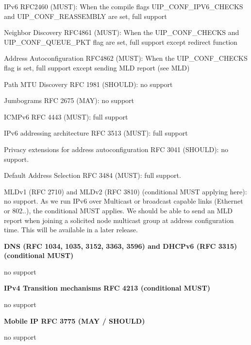 \begin{DoxyItemize}
\item \-I\-Pv6 \-R\-F\-C2460 (\-M\-U\-S\-T)\-: \-When the compile flags \-U\-I\-P\-\_\-\-C\-O\-N\-F\-\_\-\-I\-P\-V6\-\_\-\-C\-H\-E\-C\-K\-S and \-U\-I\-P\-\_\-\-C\-O\-N\-F\-\_\-\-R\-E\-A\-S\-S\-E\-M\-B\-L\-Y are set, full support \item \-Neighbor \-Discovery \-R\-F\-C4861 (\-M\-U\-S\-T)\-: \-When the \-U\-I\-P\-\_\-\-C\-O\-N\-F\-\_\-\-C\-H\-E\-C\-K\-S and \-U\-I\-P\-\_\-\-C\-O\-N\-F\-\_\-\-Q\-U\-E\-U\-E\-\_\-\-P\-K\-T flag are set, full support except redirect function \item \-Address \-Autoconfiguration \-R\-F\-C4862 (\-M\-U\-S\-T)\-: \-When the \-U\-I\-P\-\_\-\-C\-O\-N\-F\-\_\-\-C\-H\-E\-C\-K\-S flag is set, full support except sending \-M\-L\-D report (see \-M\-L\-D) \item \-Path \-M\-T\-U \-Discovery \-R\-F\-C 1981 (\-S\-H\-O\-U\-L\-D)\-: no support \item \-Jumbograms \-R\-F\-C 2675 (\-M\-A\-Y)\-: no support \item \-I\-C\-M\-Pv6 \-R\-F\-C 4443 (\-M\-U\-S\-T)\-: full support \item \-I\-Pv6 addressing architecture \-R\-F\-C 3513 (\-M\-U\-S\-T)\-: full support \item \-Privacy extensions for address autoconfiguration \-R\-F\-C 3041 (\-S\-H\-O\-U\-L\-D)\-: no support. \item \-Default \-Address \-Selection \-R\-F\-C 3484 (\-M\-U\-S\-T)\-: full support. \item \-M\-L\-Dv1 (\-R\-F\-C 2710) and \-M\-L\-Dv2 (\-R\-F\-C 3810) (conditional \-M\-U\-S\-T applying here)\-: no support. \-As we run \-I\-Pv6 over \-Multicast or broadcast capable links (\-Ethernet or 802..), the conditional \-M\-U\-S\-T applies. \-We should be able to send an \-M\-L\-D report when joining a solicited node multicast group at address configuration time. \-This will be available in a later release.\end{DoxyItemize}
{\bfseries \-D\-N\-S (\-R\-F\-C 1034, 1035, 3152, 3363, 3596) and \-D\-H\-C\-Pv6 (\-R\-F\-C 3315) (conditional \-M\-U\-S\-T)}\par
 no support

{\bfseries \-I\-Pv4 \-Transition mechanisms \-R\-F\-C 4213 (conditional \-M\-U\-S\-T)}\par
 no support

{\bfseries \-Mobile \-I\-P \-R\-F\-C 3775 (\-M\-A\-Y / \-S\-H\-O\-U\-L\-D)}\par
 no support

